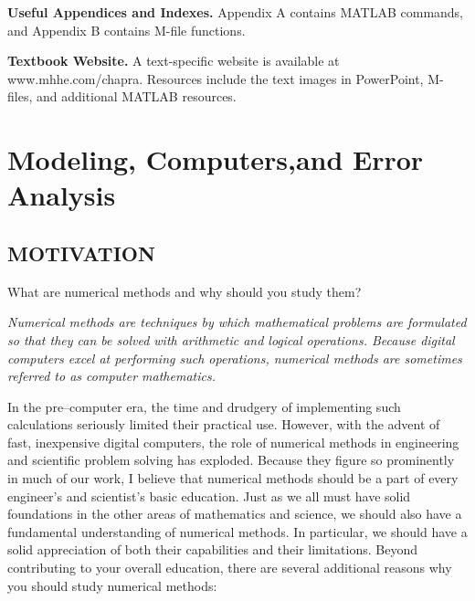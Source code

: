 \documentclass[../main.tex]{subfiles}
\begin{document}
\textbf{Useful Appendices and Indexes.} Appendix A contains MATLAB commands, and
Appendix B contains M-file functions.

\textbf{Textbook Website.} A text-specific website is available at www.mhhe.com/chapra. Resources include the text images in PowerPoint, M-files, and additional MATLAB resources.
\blankpage




\chapter*{Modeling, Computers,and Error Analysis}
\label{cha:cha_P_2}
\section{MOTIVATION}
\label{sec:sec_P_2_1}
What are numerical methods and why should you study them?


\textsl{Numerical methods are techniques by which mathematical problems are formulated so
that they can be solved with arithmetic and logical operations. Because digital computers
excel at performing such operations, numerical methods are sometimes referred to as computer mathematics.}


In the pre–computer era, the time and drudgery of implementing such calculations
seriously limited their practical use. However, with the advent of fast, inexpensive digital
computers, the role of numerical methods in engineering and scientific problem solving
has exploded. Because they figure so prominently in much of our work, I believe that numerical methods should be a part of every engineer’s and scientist’s basic education. Just
as we all must have solid foundations in the other areas of mathematics and science, we
should also have a fundamental understanding of numerical methods. In particular, we should
have a solid appreciation of both their
capabilities and their limitations.
Beyond contributing to your overall
education, there are several additional
reasons why you should study numerical
methods:
\end{document}
